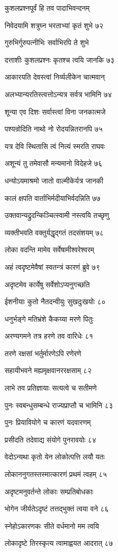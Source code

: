 कुशलप्रश्नपूर्वं हि तव पादाभिवन्दनम्

निवेदयामि शत्रुघ्न भरताभ्यां कृतं शुभे ७२

गुरुभिर्गुरुपत्नीभिः सर्वाभिरपि ते शुभे

दत्ताशीः कुशलप्रश्नः कृतश्च त्वयि जानकि ७३

आकारयति देवस्त्वां निर्व्यलीकेन चात्मवान्

अलभ्यान्यरतिस्त्वत्तोऽन्यत्र सर्वत्र भामिनि ७४

शून्या एव दिशः सर्वास्त्वां विना जनकात्मजे

पश्यन्रोदिति नाथो नो रोदयन्नितरानपि ७५

यत्र देवि स्थितासि त्वं नित्यं स्मरति राघवः

अशून्यं तु तमेवासौ मन्यमानो विदेहजे ७६

धन्योऽयमाश्रमो जातो वाल्मीकेर्यत्र जानकी

कालं क्षपति वार्ताभिर्मदीयाभिर्वदन्निति ७७

उक्तवान्यद्रुदन्किञ्चित्स्वामी नस्त्वयि तच्छृणु

व्यक्तीभवति वक्तुर्यद्धृद्गतं तदसंशयम् ७८

लोका वदन्ति मामेव सर्वेषामीश्वरेश्वरम्

अहं त्वदृष्टमेवैषां स्वतन्त्रं कारणं ब्रुवे ७९

अदृष्टमेव कार्येषु सर्वेशोऽप्यनुगच्छति

ईशनीयाः कुतो नैतदन्वीयुः सुखदुःखयोः ८०

धनुर्भङ्गे मतिभ्रंशे कैकय्या मरणे पितुः

अरण्यगमने तत्र हरणे तव वारिधेः ८१

तरणे रक्षसां भर्तुर्मारणेऽपि रणेरणे

सहायीभवने मह्यमृक्षवानररक्षसाम् ८२

लाभे तव प्रतिज्ञायाः सत्यत्वे च सतीमणे

पुनः स्वबन्धुसम्बन्धे राज्यप्राप्तौ च भामिनि ८३

पुनः प्रियावियोगे च कारणं यदवारणम्

प्रसीदति तदेवाद्य संयोगे पुनरावयोः ८४

वेदोऽन्यथा कृतो येन लोकोत्पत्ति लयौ यतः

लोकाननुगतस्तस्मात्कारणं प्रथमं त्वहम् ८५

अदृष्टमनुवर्तन्ते लोकाः सम्प्रतिबोधकाः

भोगेन जीर्यतेऽदृष्टं तत्तद्भुक्तं त्वया वने ८६

स्नेहोऽकारणकः सीते वर्धमानो मम त्वयि

लोकादृष्टे तिरस्कृत्य त्वामाह्वयत आदरात् ८७

